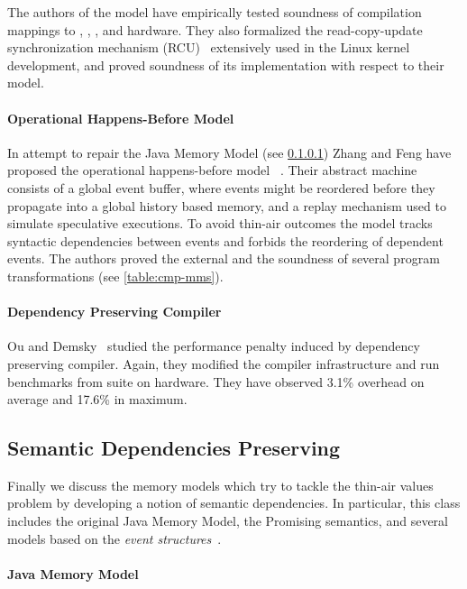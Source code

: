 The authors of the model have empirically tested 
soundness of compilation mappings to 
\Intel, , , and \POWER hardware. 
They also formalized the read-copy-update 
synchronization mechanism (RCU)~\cite{McKenney-RCU2007} 
extensively used in the Linux kernel development, 
and proved soundness of its implementation with respect to their model.

\paragraph{Operational Happens-Before Model}

In attempt to repair the Java Memory Model (see \cref{sec:catalog:jmm})
Zhang and Feng have proposed the 
operational happens-before model \OHMM~\cite{Zhang-Feng:FCS16}.
Their abstract machine consists of a global event buffer,
where events might be reordered before they propagate into  
a global history based memory, and a replay mechanism 
used to simulate speculative executions. 
To avoid thin-air outcomes the model tracks syntactic dependencies 
between events and forbids the reordering of dependent events. 
The authors proved the external \DRF and 
the soundness of several program transformations
(see \cref{table:cmp-mms}). 

\paragraph{Dependency Preserving Compiler}

Ou and Demsky~\cite{Ou-Demsky:OOPSLA18} studied 
the performance penalty induced by dependency preserving compiler. 
Again, they modified the \LLVM compiler infrastructure 
and run benchmarks from \SPECCPU suite on  hardware. 
They have observed 3.1\% overhead on average and 17.6\% in maximum. 

\subsection{Semantic Dependencies Preserving}
\label{sec:catalog:sdeprf}

Finally we discuss the memory models 
which try to tackle the thin-air values problem 
by developing a notion of semantic dependencies. 
In particular, this class includes the original Java Memory Model, 
the Promising semantics, and several models based 
on the \emph{event structures}~\cite{Winskel:86}.

\paragraph{Java Memory Model}
\label{sec:catalog:jmm}

